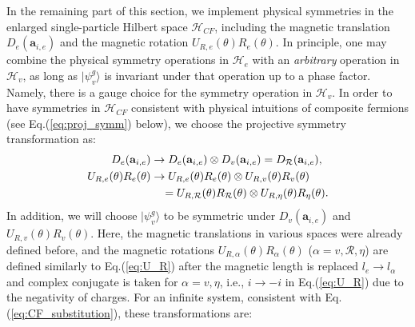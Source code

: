 In the remaining part of this section, we implement physical symmetries in the enlarged single-particle Hilbert space $\mathcal H_{CF}$, including the magnetic translation $D_e(\mathbf a_{i,e})$ and the magnetic rotation $U_{R,e}(\theta)R_e(\theta)$. In principle, one may combine the physical symmetry operations in $\mathcal H_e$ with an \emph{arbitrary} operation in $\mathcal H_v$, as long as $|\psi_v^g\rangle$ is invariant under that operation up to a phase factor. Namely, there is a gauge choice for the symmetry operation in $\mathcal H_v$. In order to have symmetries in $\mathcal H_{CF}$ consistent with physical intuitions of composite fermions (see Eq.(\ref{eq:proj_symm}) below), we choose the projective symmetry transformation as:
\begin{align}
D_e(\mathbf a_{i,e}) &\rightarrow D_e(\mathbf a_{i,e})\otimes D_v(\mathbf a_{i,e})=D_{\mathcal R}(\mathbf a_{i,e}),\notag\\
U_{R,e}(\theta)R_e(\theta)&\rightarrow U_{R,e}(\theta)R_e(\theta)\otimes U_{R,v}(\theta)R_v(\theta)\notag\\
&\quad=U_{R,\mathcal R}(\theta)R_{\mathcal R}(\theta)\otimes U_{R,\eta}(\theta)R_{\eta}(\theta).
\end{align}
In addition, we will choose $|\psi_v^g\rangle$ to be symmetric under $D_v(\mathbf a_{i,e})$ and $U_{R,v}(\theta)R_v(\theta)$. Here, the magnetic translations in various spaces were already defined before, and the magnetic rotations $U_{R,\alpha}(\theta)R_{\alpha}(\theta)$ ($\alpha=v,\mathcal R,\eta$) are defined similarly to Eq.(\ref{eq:U_R}) after the magnetic length is replaced $l_e\rightarrow l_{\alpha}$ and complex conjugate is taken for $\alpha=v,\eta$, i.e., $i\rightarrow -i$ in Eq.(\ref{eq:U_R}) due to the negativity of charges. For an infinite system, consistent with Eq.(\ref{eq:CF_substitution}), these transformations are:
